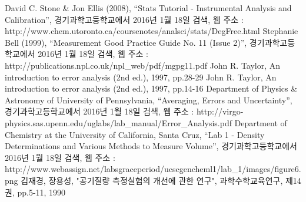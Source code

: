 \documentclass{GSHS-chemexp}
\begin{document}
	\begin{thebibliography}{00}
		 David C. Stone \& Jon Ellis (2008),
		``Stats Tutorial - Instrumental Analysis and Calibration'',
		경기과학고등학교에서 2016년 1월 18일 검색,
		웹 주소 :
		http://www.chem.utoronto.ca/\allowbreak coursenotes/analsci/stats/DegFree.html
		 Stephanie Bell (1999),
		``Measurement Good Practice Guide No. 11 (Issue 2)'',
		경기과학고등학교에서 2016년 1월 18일 검색,
		웹 주소 : http://publications.npl.co.uk/npl\_web/pdf/mgpg11.pdf
		 John R. Taylor,
		An introduction to error analysis (2nd ed.), 1997, pp.28-29
		 John R. Taylor,
		An introduction to error analysis (2nd ed.), 1997, pp.14-16
		 Department of Physics \& Astronomy of
		University of Pennsylvania, ``Averaging, Errors and Uncertainty'',
		경기과학고등학교에서 2016년 1월 18일 검색,
		웹 주소 :
		http://virgo-physics.sas.upenn.edu/\allowbreak uglabs/lab\_manual/Error\_Analysis.pdf
		 Department of Chemistry at the University of
		California, Santa Cruz, ``Lab 1 - Density Determinations and Various Methods to Measure Volume'',
		경기과학고등학교에서 2016년 1월 18일 검색,
		웹 주소 :
		http://www.webassign.net/labsgraceperiod/ucscgencheml1/lab\_1/images/figure6.png
		 김재경, 장용성,
		"공기질량 측정실험의 개선에 관한 연구",
		과학수학교육연구, 제14권, pp.5-11, 1990
	\end{thebibliography}
			
\end{document}
